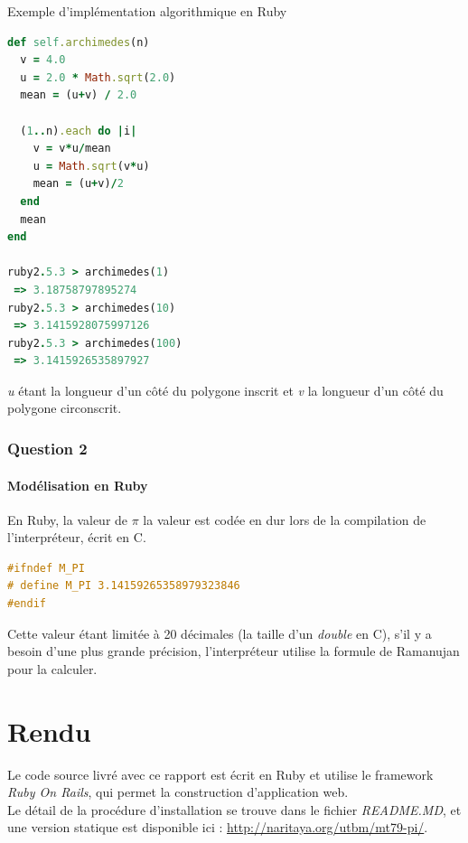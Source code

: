 \documentclass[a4paper,10pt]{report}
\begin{document}
\bigskip
Exemple d'implémentation algorithmique en Ruby
\begin{lstlisting}[language=Ruby]
def self.archimedes(n)
  v = 4.0
  u = 2.0 * Math.sqrt(2.0)
  mean = (u+v) / 2.0

  (1..n).each do |i|
    v = v*u/mean
    u = Math.sqrt(v*u)
    mean = (u+v)/2
  end
  mean
end

ruby2.5.3 > archimedes(1)
 => 3.18758797895274
ruby2.5.3 > archimedes(10)
 => 3.1415928075997126
ruby2.5.3 > archimedes(100)
 => 3.1415926535897927
\end{lstlisting}
\textit{u} étant la longueur d'un côté du polygone inscrit et \textit{v} la longueur d'un côté du polygone circonscrit.

\subsection{Question 2}
\subsubsection{Modélisation en Ruby}
En Ruby, la valeur de $\pi$ la valeur est codée en dur lors de la compilation de l'interpréteur, écrit en C.
\begin{lstlisting}[language=C]
#ifndef M_PI
# define M_PI 3.14159265358979323846
#endif
\end{lstlisting}
Cette valeur étant limitée à 20 décimales (la taille d'un \textit{double} en C), s'il y a besoin d'une plus grande précision, l'interpréteur utilise la formule de Ramanujan pour la calculer. 

\chapter{Rendu}
Le code source livré avec ce rapport est écrit en Ruby et utilise le framework \textit{Ruby On Rails}, qui permet la construction d'application web.\\
Le détail de la procédure d'installation se trouve dans le fichier \textit{README.MD}, et une version statique est disponible ici : \url{http://naritaya.org/utbm/mt79-pi/}.
\end{document}
